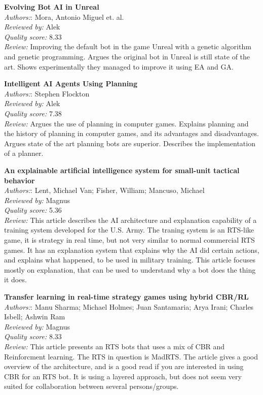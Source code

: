 \textbf{Evolving Bot AI in Unreal} \\
\textit{Authors:}: Mora, Antonio Miguel et. al.\\
\textit{Reviewed by:} Alek\\
\textit{Quality score:} 8.33\\
\textit{Review:} Improving the default bot in the game Unreal with a genetic algorithm and genetic programming. Argues the original bot in Unreal is still state of the art. Shows experimentally they managed to improve it using EA and GA.

\textbf{Intelligent AI Agents Using Planning} \\
\textit{Authors:}: Stephen Flockton\\
\textit{Reviewed by:} Alek\\
\textit{Quality score:} 7.38\\
\textit{Review:} Argues the use of planning in computer games. Explains planning and the history of planning in computer games, and its advantages and disadvantages. Argues state of the art planning bots are superior. Describes the implementation of a planner.

\textbf{An explainable artificial intelligence system for small-unit tactical behavior}\\
\textit{Authors:}: Lent, Michael Van; Fisher, William; Mancuso, Michael\\
\textit{Reviewed by:} Magnus\\
\textit{Quality score:} 5.36\\
\textit{Review:} This article describes the AI architecture and explanation capability of a training system developed for the U.S. Army. The traning system is an RTS-like game, it is strategy in real time, but not very similar to normal commercial RTS games. It has an explanation system that explains why the AI did certain actions, and explains what happened, to be used in military training. This article focuses mostly on explanation, that can be used to understand why a bot does the thing it does.

\textbf{Transfer learning in real-time strategy games using hybrid CBR/RL}\\
\textit{Authors:}: Manu Sharma; Michael Holmes; Juan Santamaria; Arya Irani; Charles Isbell; Ashwin Ram\\
\textit{Reviewed by:} Magnus\\
\textit{Quality score:} 8.33\\
\textit{Review:} This article presents an RTS bots that uses a mix of CBR and Reinforcment learning. The RTS in question is MadRTS. The article gives a good overview of the architecture, and is a good read if you are interested in using CBR for an RTS bot. It is using a layered approach, but does not seem very suited for collaboration between several persons/groups.

